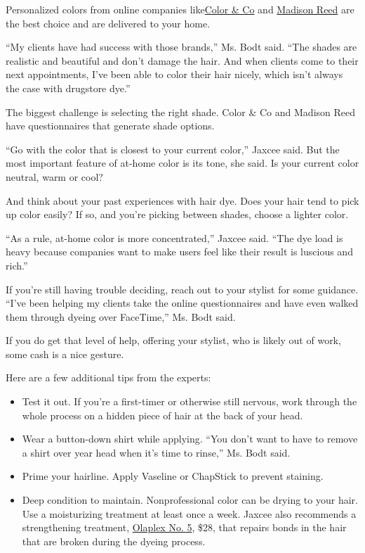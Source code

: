 Personalized colors from online companies
like\href{https://www.colorandco.com/}{Color \& Co} and
\href{https://www.madison-reed.com/}{Madison Reed} are the best choice
and are delivered to your home.

``My clients have had success with those brands,'' Ms. Bodt said. ``The
shades are realistic and beautiful and don't damage the hair. And when
clients come to their next appointments, I've been able to color their
hair nicely, which isn't always the case with drugstore dye.''

The biggest challenge is selecting the right shade. Color \& Co and
Madison Reed have questionnaires that generate shade options.

``Go with the color that is closest to your current color,'' Jaxcee
said. But the most important feature of at-home color is its tone, she
said. Is your current color neutral, warm or cool?

And think about your past experiences with hair dye. Does your hair tend
to pick up color easily? If so, and you're picking between shades,
choose a lighter color.

``As a rule, at-home color is more concentrated,'' Jaxcee said. ``The
dye load is heavy because companies want to make users feel like their
result is luscious and rich.''

If you're still having trouble deciding, reach out to your stylist for
some guidance. ``I've been helping my clients take the online
questionnaires and have even walked them through dyeing over FaceTime,''
Ms. Bodt said.

If you do get that level of help, offering your stylist, who is likely
out of work, some cash is a nice gesture.

Here are a few additional tips from the experts:

\begin{itemize}
\item
  Test it out. If you're a first-timer or otherwise still nervous, work
  through the whole process on a hidden piece of hair at the back of
  your head.
\item
  Wear a button-down shirt while applying. ``You don't want to have to
  remove a shirt over year head when it's time to rinse,'' Ms. Bodt
  said.
\item
  Prime your hairline. Apply Vaseline or ChapStick to prevent staining.
\item
  Deep condition to maintain. Nonprofessional color can be drying to
  your hair. Use a moisturizing treatment at least once a week. Jaxcee
  also recommends a strengthening treatment,
  \href{https://olaplex.com/products/no-5-bond-maintenance-conditioner}{Olaplex
  No. 5}, \$28, that repairs bonds in the hair that are broken during
  the dyeing process.
\end{itemize}

